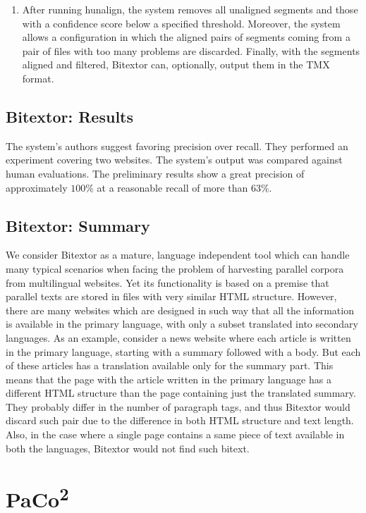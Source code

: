 \begin{enumerate}
	\item After running hunalign, the system removes all unaligned segments and those with a confidence score below a specified threshold. Moreover, the system allows a configuration in which the aligned pairs of segments coming from a pair of files with too many problems are discarded. Finally, with the segments aligned and filtered, Bitextor can, optionally, output them in the TMX format.
\end{enumerate}

\subsection{Bitextor: Results}
\label{subsection:bitextor_results}

The system's authors suggest favoring precision over recall. They performed an experiment covering two websites. The system's output was compared against human evaluations. The preliminary results show a great precision of approximately $100\%$ at a reasonable recall of more than $63\%$.

\subsection{Bitextor: Summary}
\label{subsection:bitextor_summary}

We consider Bitextor as a mature, language independent tool which can handle many typical scenarios when facing the problem of harvesting parallel corpora from multilingual websites. Yet its functionality is based on a premise that parallel texts are stored in files with very similar HTML structure. However, there are many websites which are designed in such way that all the information is available in the primary language, with only a subset translated into secondary languages. As an example, consider a news website where each article is written in the primary language, starting with a summary followed with a body. But each of these articles has a translation available only for the summary part. This means that the page with the article written in the primary language has a different HTML structure than the page containing just the translated summary. They probably differ in the number of paragraph tags, and thus Bitextor would discard such pair due to the difference in both HTML structure and text length. Also, in the case where a single page contains a same piece of text available in both the languages, Bitextor would not find such bitext.

\section{PaCo\textsuperscript{2}}
\label{section:paco2}

